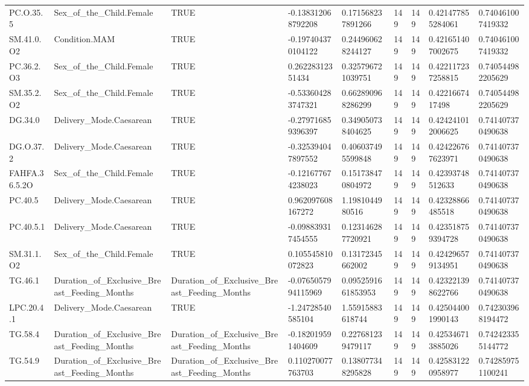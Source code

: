 \begin{longtable}{lllllllll}
PC.O.35.5 & Sex\_of\_the\_Child.Female & TRUE & -0.138312068792208 & 0.171568237891266 & 149 & 149 & 0.421477855284061 & 0.740461007419332 \\
SM.41.0.O2 & Condition.MAM & TRUE & -0.197404370104122 & 0.244960628244127 & 149 & 149 & 0.421651407002675 & 0.740461007419332 \\
PC.36.2.O3 & Sex\_of\_the\_Child.Female & TRUE & 0.26228312351434 & 0.325796721039751 & 149 & 149 & 0.422117237258815 & 0.740544982205629 \\
SM.35.2.O2 & Sex\_of\_the\_Child.Female & TRUE & -0.533604283747321 & 0.662890968286299 & 149 & 149 & 0.4221667417498 & 0.740544982205629 \\
DG.34.0 & Delivery\_Mode.Caesarean & TRUE & -0.279716859396397 & 0.349050738404625 & 149 & 149 & 0.424241012006625 & 0.741407370490638 \\
DG.O.37.2 & Delivery\_Mode.Caesarean & TRUE & -0.325394047897552 & 0.406037495599848 & 149 & 149 & 0.424226767623971 & 0.741407370490638 \\
FAHFA.36.5.2O & Sex\_of\_the\_Child.Female & TRUE & -0.121677674238023 & 0.151738470804972 & 149 & 149 & 0.42393748512633 & 0.741407370490638 \\
PC.40.5 & Delivery\_Mode.Caesarean & TRUE & 0.962097608167272 & 1.1981044980516 & 149 & 149 & 0.42328866485518 & 0.741407370490638 \\
PC.40.5.1 & Delivery\_Mode.Caesarean & TRUE & -0.098839317454555 & 0.123146287720921 & 149 & 149 & 0.423518759394728 & 0.741407370490638 \\
SM.31.1.O2 & Sex\_of\_the\_Child.Female & TRUE & 0.105545810072823 & 0.13172345662002 & 149 & 149 & 0.424296579134951 & 0.741407370490638 \\
TG.46.1 & Duration\_of\_Exclusive\_Breast\_Feeding\_Months & Duration\_of\_Exclusive\_Breast\_Feeding\_Months & -0.0765057994115969 & 0.0952591661853953 & 149 & 149 & 0.423221398622766 & 0.741407370490638 \\
LPC.20.4.1 & Delivery\_Mode.Caesarean & TRUE & -1.24728540585104 & 1.55915883618744 & 149 & 149 & 0.425044001990143 & 0.742303968194472 \\
TG.58.4 & Duration\_of\_Exclusive\_Breast\_Feeding\_Months & Duration\_of\_Exclusive\_Breast\_Feeding\_Months & -0.182019591404609 & 0.227681239479117 & 149 & 149 & 0.425346713885026 & 0.742423355144772 \\
TG.54.9 & Duration\_of\_Exclusive\_Breast\_Feeding\_Months & Duration\_of\_Exclusive\_Breast\_Feeding\_Months & 0.110270077763703 & 0.138077348295828 & 149 & 149 & 0.425831220958977 & 0.742859751100241 \\

\end{longtable}
